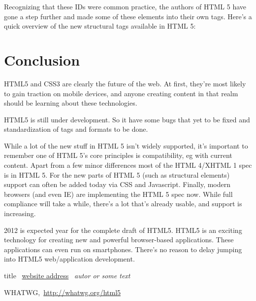 \documentclass[12pt,a4paper]{report}
\begin{document}
Recognizing that these IDs were common practice, the authors of HTML 5 have gone a step further and made some of these elements into their own tags. Here’s a quick overview of the new structural tags available in HTML 5:

\chapter{Conclusion}
HTML5 and CSS3 are clearly the future of the web. At first, they're most likely to gain traction on mobile devices, and anyone creating content in that realm should be learning about these technologies.

HTML5 is still under development. So it have some bugs that yet to be fixed and standardization of tags and formats to be done.

While a lot of the new stuff in HTML 5 isn’t widely supported, it’s important to remember one of HTML 5’s core principles is compatibility, eg with current content. Apart from a few minor differences most of the HTML 4/XHTML 1 spec is in HTML 5. For the new parts of HTML 5 (such as structural elements) support can often be added today via CSS and Javascript. Finally, modern browsers (and even IE) are implementing the HTML 5 spec now. While full compliance will take a while, there’s a lot that’s already usable, and support is increasing.

2012 is expected year for the complete draft of HTML5. HTML5 is an exciting technology for creating new and powerful browser-based applications. These applications can even run on smartphones. There's no reason to delay jumping into HTML5 web/application development.



\begin{thebibliography}{2}

title \ \url{website address} \ \textit{autor or some text}

WHATWG,\ \url{http://whatwg.org/html5}

\end{thebibliography}
\end{document}
